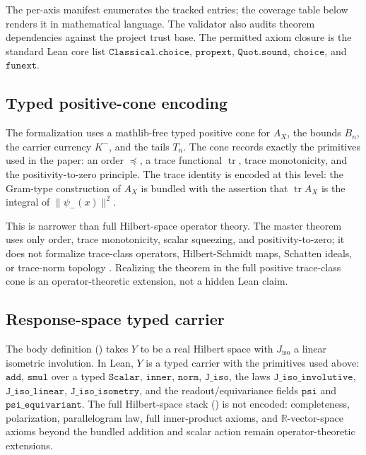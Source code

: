 \documentclass[11pt]{article}
\DeclareMathOperator{\trace}{tr}
\newcommand{\psim}{\psi_{-}}
\newcommand{\AX}{A_{X}}
\newcommand{\Kminus}{K^{-}}
\newcommand{\Jiso}{J_{\mathrm{iso}}}
\theoremstyle{definition}
\begin{document}
The per-axis manifest enumerates the tracked entries; the coverage
table below renders it in mathematical language.  The validator also
audits theorem dependencies against the project trust base.  The
permitted axiom closure is the standard Lean core list
\(\texttt{Classical.choice}\), \(\texttt{propext}\),
\(\texttt{Quot.sound}\), \(\texttt{choice}\), and
\(\texttt{funext}\).

\subsection*{Typed positive-cone encoding}

The formalization uses a mathlib-free typed positive cone for \(\AX\),
the bounds \(B_n\), the carrier currency \(\Kminus\), and the tails
\(T_n\).  The cone records exactly the primitives used in the paper:
an order \(\preceq\), a trace functional \(\trace\), trace monotonicity,
and the positivity-to-zero principle.  The trace identity is encoded
at this level: the Gram-type construction of \(\AX\) is bundled with
the assertion that \(\trace\AX\) is the integral of
\(\|\psim(x)\|^2\).

This is narrower than full Hilbert-space operator theory.  The master
theorem uses only order, trace monotonicity, scalar squeezing, and
positivity-to-zero; it does not formalize trace-class operators,
Hilbert-Schmidt maps, Schatten ideals, or trace-norm topology
\citep{Simon2005,ReedSimon1980}.  Realizing the theorem in the full
positive trace-class cone is an operator-theoretic extension, not a
hidden Lean claim.

\subsection*{Response-space typed carrier}

The body definition
() takes \(Y\)
to be a real Hilbert space with \(\Jiso\) a linear isometric
involution.  In Lean, \(Y\) is a typed carrier with the primitives used
above: \(\mathtt{add}\), \(\mathtt{smul}\) over a typed
\(\mathtt{Scalar}\), \(\mathtt{inner}\), \(\mathtt{norm}\),
\(\mathtt{J\_iso}\), the laws \(\mathtt{J\_iso\_involutive}\),
\(\mathtt{J\_iso\_linear}\), \(\mathtt{J\_iso\_isometry}\), and the
readout/equivariance fields \(\mathtt{psi}\) and
\(\mathtt{psi\_equivariant}\).  The full Hilbert-space stack
(\citealp{ReedSimon1980,Conway1990}) is not encoded: completeness,
polarization, parallelogram law, full inner-product axioms, and
\(\mathbb{R}\)-vector-space axioms beyond the bundled addition and
scalar action remain operator-theoretic extensions.
\end{document}
